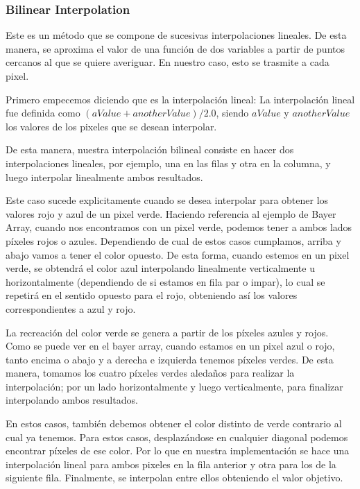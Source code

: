 \subsubsection{Bilinear Interpolation}
Este es un método que se compone de sucesivas interpolaciones lineales. De esta manera, se aproxima el valor de una función de dos variables a partir de puntos cercanos al que se quiere averiguar. En nuestro caso, esto se trasmite a cada pixel.  
\par 
Primero empecemos diciendo que es la interpolación lineal:
La interpolación lineal fue definida como \textit{$(aValue + anotherValue)/2.0$}, siendo $aValue$ y $anotherValue$ los valores de los pixeles que se desean interpolar. 
\par 
De esta manera, nuestra interpolación bilineal consiste en hacer dos interpolaciones lineales, por ejemplo, una en las filas y otra en la columna, y luego interpolar linealmente ambos resultados.
\par 
Este caso sucede explicitamente cuando se desea interpolar para obtener los valores rojo y azul de un pixel verde. Haciendo referencia al ejemplo de Bayer Array, cuando nos encontramos con un pixel verde, podemos tener a ambos lados píxeles rojos o azules. Dependiendo de cual de estos casos cumplamos, arriba y abajo vamos a tener el color opuesto. De esta forma, cuando estemos en un pixel verde, se obtendrá el color azul interpolando linealmente verticalmente u horizontalmente (dependiendo de si estamos en fila par o impar), lo cual se repetirá en el sentido opuesto para el rojo, obteniendo así los valores correspondientes a azul y rojo.
\par 
La recreación del color verde se genera a partir de los píxeles azules y rojos. Como se puede ver en el bayer array, cuando estamos en un pixel azul o rojo, tanto encima o abajo y a derecha e izquierda tenemos píxeles verdes. De esta manera, tomamos los cuatro píxeles verdes aledaños para realizar la interpolación; por un lado horizontalmente y luego verticalmente, para finalizar interpolando ambos resultados. 
\par 
En estos casos, también debemos obtener el color distinto de verde contrario al cual ya tenemos. Para estos casos, desplazándose en cualquier diagonal podemos encontrar píxeles de ese color. Por lo que en nuestra implementación se hace una interpolación lineal para ambos pixeles en la fila anterior y otra para los de la siguiente fila. Finalmente, se interpolan entre ellos obteniendo el valor objetivo.
\par 
